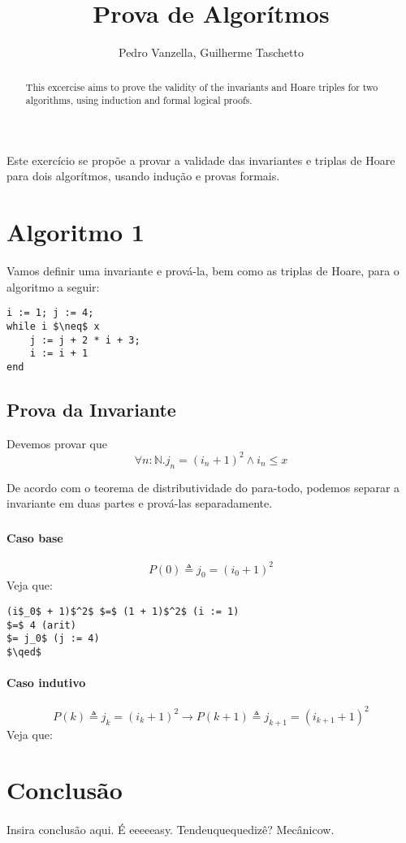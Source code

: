 \documentclass[12pt]{article}
\title{Prova de Algorítmos}
\author{Pedro Vanzella\inst{1}, Guilherme Taschetto\inst{1}}
\begin{document}
\maketitle

\begin{abstract}
    This excercise aims to prove the validity of the invariants and Hoare
    triples for two algorithms, using induction and formal logical proofs.
\end{abstract}

\begin{resumo}
    Este exercício se propõe a provar a validade das invariantes e triplas de
    Hoare para dois algorítmos, usando indução e provas formais.
\end{resumo}

\section{Algoritmo 1}\label{sec:algo1}
Vamos definir uma invariante e prová-la, bem como as triplas de Hoare, para o
algoritmo a seguir:
\begin{lstlisting}
i := 1; j := 4;
while i $\neq$ x
    j := j + 2 * i + 3;
    i := i + 1
end
\end{lstlisting}

\subsection{Prova da Invariante}\label{sec:algo1:invar}
Devemos provar que
\[\forall n:\mathds{N}. j_n = (i_n + 1)^2 \wedge i_n \leq x\]

De acordo com o teorema de distributividade do para-todo, podemos separar
a invariante em duas partes e prová-las separadamente.

\subsubsection{}

\paragraph{Caso base} \[P(0) \triangleq j_0 = (i_0 + 1)^2 \]
Veja que:
\begin{lstlisting}
(i$_0$ + 1)$^2$ $=$ (1 + 1)$^2$ (i := 1)
$=$ 4 (arit)
$= j_0$ (j := 4)
$\qed$
\end{lstlisting}

\paragraph{Caso indutivo} \[P(k) \triangleq j_k = (i_k + 1)^2 \rightarrow
P(k+1) \triangleq j_{k+1} = (i_{k+1} +1)^2\]
Veja que:


\section{Conclusão}
\paragraph{}
Insira conclusão aqui.
É eeeeeasy. Tendeuquequedizê? Mecânicow.



\end{document}
